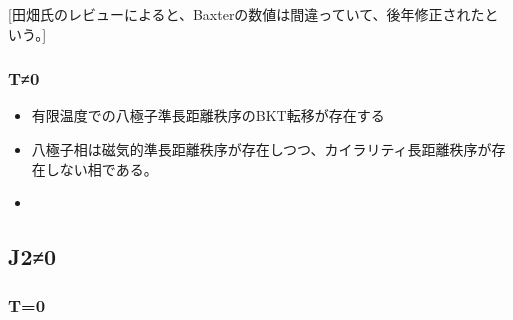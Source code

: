 \documentclass[12pt,titlepage,dvipdfmx]{jarticle}
\begin{document}
[田畑氏のレビューによると、Baxterの数値は間違っていて、後年修正されたという。]


\subsubsection{T≠0}
\begin{itemize}
   \item 有限温度での八極子準長距離秩序のBKT転移が存在する
   \item 八極子相は磁気的準長距離秩序が存在しつつ、カイラリティ長距離秩序が存在しない相である。
   \item 
\end{itemize}
\newpage

\subsection{J2≠0}

\subsubsection{T=0}
\end{document}
